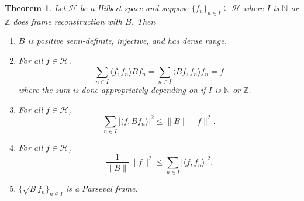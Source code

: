 \documentclass[11pt]{amsart}
\newtheorem{thm}{Theorem}[section]
\theoremstyle{definition}
\numberwithin{equation}{section}
\newcommand{\Hcal}{\mathcal{H}} %
\begin{document}
\begin{thm}\label{doesframerecprop}
Let $\Hcal$ be a Hilbert space and suppose $\{f_{n}\}_{n\in I}\subseteq \Hcal$ where $I$ is $\mathbb{N}$ or $\mathbb{Z}$ does frame reconstruction with $B$. Then 
\begin{enumerate}
    \item \(B\) is positive semi-definite, injective, and has dense range.
    \item For all $f\in \Hcal$, $$\sum_{n\in I}\langle f, f_n\rangle Bf_n=\sum_{n\in I}\langle Bf, f_n\rangle f_n=f$$ where the sum is done appropriately depending on if $I$ is $\mathbb{N}$ or $\mathbb{Z}$.
    \item For all $f\in \Hcal$, $$\sum_{n\in I}|\langle f, Bf_{n}\rangle|^{2} \leq  \|B\| \|f\|^{2}.$$
    \item For all $f\in \Hcal$,
    \[
    \frac{1}{\|B\|}\|f\|^2 \leq \sum_{n\in I} |\langle f, f_n \rangle|^2.
    \]
    \item $\{\sqrt{B}f_n\}_{n\in I}$ is a Parseval frame.
\end{enumerate}
\end{thm}
\end{document}
